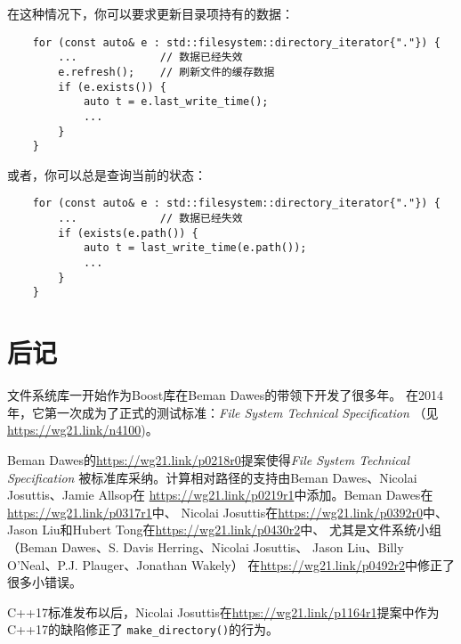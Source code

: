 在这种情况下，你可以要求更新目录项持有的数据：
\begin{lstlisting}
    for (const auto& e : std::filesystem::directory_iterator{"."}) {
        ...             // 数据已经失效
        e.refresh();    // 刷新文件的缓存数据
        if (e.exists()) {
            auto t = e.last_write_time();
            ...
        }
    }
\end{lstlisting}
或者，你可以总是查询当前的状态：
\begin{lstlisting}
    for (const auto& e : std::filesystem::directory_iterator{"."}) {
        ...             // 数据已经失效
        if (exists(e.path()) {
            auto t = last_write_time(e.path());
            ...
        }
    }
\end{lstlisting}


\section{后记}
文件系统库一开始作为Boost库在Beman Dawes的带领下开发了很多年。
在2014年，它第一次成为了正式的测试标准：\emph{File System Technical Specification}
（见\url{https://wg21.link/n4100})。

Beman Dawes的\url{https://wg21.link/p0218r0}提案使得\emph{File System Technical Specification}
被标准库采纳。计算相对路径的支持由Beman Dawes、Nicolai Josuttis、Jamie Allsop在
\url{https://wg21.link/p0219r1}中添加。Beman Dawes在\url{https://wg21.link/p0317r1}中、
Nicolai Josuttis在\url{https://wg21.link/p0392r0}中、Jason Liu和Hubert Tong在\url{https://wg21.link/p0430r2}中、
尤其是文件系统小组
（Beman Dawes、S. Davis Herring、Nicolai Josuttis、 Jason Liu、Billy O’Neal、P.J. Plauger、Jonathan Wakely）
在\url{https://wg21.link/p0492r2}中修正了很多小错误。

C++17标准发布以后，Nicolai Josuttis在\url{https://wg21.link/p1164r1}提案中作为C++17的缺陷修正了
\texttt{make\_directory()}的行为。